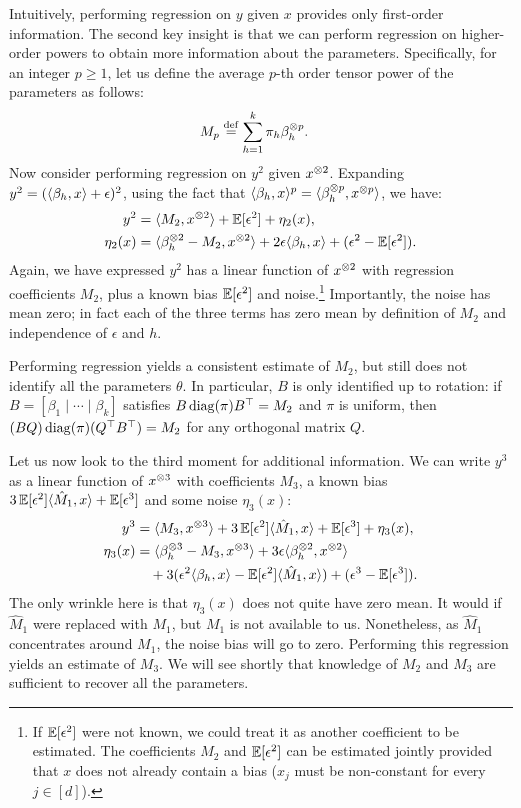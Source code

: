 Intuitively, performing regression on $y$ given $x$ provides only first-order
information.  The second key insight is that we can perform regression
on higher-order powers to obtain more information about the parameters.
Specifically, for an integer $p \ge 1$, let us define the average
$p$-th order tensor power of the parameters as follows:
\begin{align}
M_p &\eqdef \sum_{h=1}^k \pi_h \beta_h\tp{p}. \label{eqn:Mp} %
\end{align}
Now consider performing regression on $y^2$ given $x^{\otimes 2}$.
Expanding $y^2 = (\langle \beta_h, x \rangle + \epsilon)^2$,
using the fact that $\langle \beta_h, x \rangle^p = \langle \beta_h^{\otimes p}, x^{\otimes p} \rangle$,
we have:
\begin{align}
  y^2 &= \langle M_2, x^{\otimes 2} \rangle + \operatorname{\mathbb{E}}[\epsilon^2] + \eta_2(x), \label{eqn:y2} \\
\eta_2(x) &= \langle \beta_h^{\otimes 2} - M_2, x^{\otimes 2} \rangle + 2 \epsilon \langle \beta_h, x \rangle + (\epsilon^2 - \operatorname{\mathbb{E}}[\epsilon^2]). \nonumber
\end{align}
Again, we have expressed $y^2$ has a linear function of $x^{\otimes 2}$
with regression coefficients $M_2$, plus a known bias $\operatorname{\mathbb{E}}[\epsilon^2]$ and noise.\footnote{If $\operatorname{\mathbb{E}}[\epsilon^2]$ were not known,
we could treat it as another coefficient
to be estimated.  The coefficients $M_2$ and $\operatorname{\mathbb{E}}[\epsilon^2]$ can be estimated jointly
provided that $x$ does not already contain a bias ($x_j$ must be non-constant for every $j \in [d]$).}
Importantly, the noise has mean zero; 
in fact each of the three terms has zero mean
by definition of $M_2$ and independence of $\epsilon$ and $h$.

Performing regression yields a consistent estimate of $M_2$,
but still does not identify all the parameters $\theta$.
In particular, $B$ is only identified up to rotation:
if $B = [\beta_1 \mid \cdots \mid \beta_k]$ satisfies
$B \operatorname{diag}(\pi) B^\top = M_2$ and $\pi$ is uniform, then $(B Q) \operatorname{diag}(\pi) (Q^\top B^\top) = M_2$
for any orthogonal matrix $Q$.

Let us now look to the third moment for additional information.
We can write $y^3$ as a linear function of $x^{\otimes 3}$ with coefficients $M_3$,
a known bias $3 \operatorname{\mathbb{E}}[\epsilon^2] \langle \hat M_1, x \rangle + \operatorname{\mathbb{E}}[\epsilon^3]$ and some noise $\eta_3(x)$:
\begin{align}
  y^3 &= \langle M_3, x^{\otimes 3} \rangle + 3\operatorname{\mathbb{E}}[\epsilon^2] \langle \hat M_1, x \rangle + \operatorname{\mathbb{E}}[\epsilon^3] + \eta_3(x), \nonumber \\
\eta_3(x) &= \langle \beta_h^{\otimes 3} - M_3, x^{\otimes 3} \rangle
+ 3 \epsilon \langle \beta_h^{\otimes 2}, x^{\otimes 2} \rangle \label{eqn:y3} \\
&\quad + 3(\epsilon^2 \langle \beta_h, x \rangle - \operatorname{\mathbb{E}}[\epsilon^2] \langle \hat M_1, x \rangle)
+ (\epsilon^3 - \operatorname{\mathbb{E}}[\epsilon^3]). \nonumber
\end{align}
The only wrinkle here is that $\eta_3(x)$ does not quite have zero mean.
It would if $\hat M_1$ were replaced with $M_1$, but $M_1$ is not available to us.
Nonetheless, as $\hat M_1$ concentrates around $M_1$, the noise bias will go to zero.
Performing this regression yields an estimate of $M_3$.
We will see shortly that knowledge of $M_2$ and $M_3$ are sufficient to recover
all the parameters.

